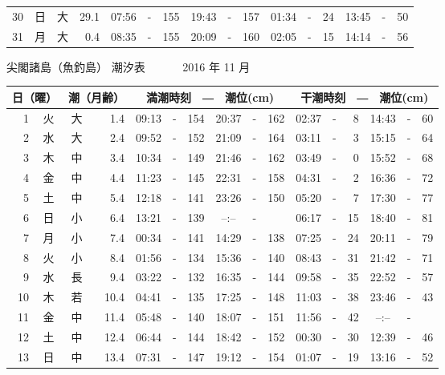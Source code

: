 \documentclass[12pt.a4j]{jsarticle}
\begin{document}
\begin{center}
\begin{table}[ht]
\begin{tabular}{|rc|cr|ccrccr|ccrccr|}
30 & 日 & 大 & 29.1 &  07:56 &-& 155  &  19:43 &-& 157  &   01:34 &-&  24  &   13:45 &-&  50  \\
31 & 月 & 大 &  0.4 &  08:35 &-& 155  &  20:09 &-& 160  &   02:05 &-&  15  &   14:14 &-&  56  \\
   \hline
   \end{tabular}
\end{table}
\newpage
 {\LARGE 尖閣諸島（魚釣島）  潮汐表　　　}
 {\large 2016 年 11 月}\\
 \begin{table}[ht]
    \begin{tabular}{|rc|cr|ccrccr|ccrccr|}
    \hline
    \multicolumn{2}{|c|}{日（曜）} & \multicolumn{2}{c|}{潮（月齢）} & \multicolumn{6}{c|}{満潮時刻　―　潮位(cm)} & \multicolumn{6}{c|}{干潮時刻　―　潮位(cm)} \\
 \hline
 1 & 火 & 大 &  1.4 &  09:13 &-& 154  &  20:37 &-& 162  &   02:37 &-&   8  &   14:43 &-&  60  \\
 2 & 水 & 大 &  2.4 &  09:52 &-& 152  &  21:09 &-& 164  &   03:11 &-&   3  &   15:15 &-&  64  \\
 3 & 木 & 中 &  3.4 &  10:34 &-& 149  &  21:46 &-& 162  &   03:49 &-&   0  &   15:52 &-&  68  \\
 4 & 金 & 中 &  4.4 &  11:23 &-& 145  &  22:31 &-& 158  &   04:31 &-&   2  &   16:36 &-&  72  \\
 5 & 土 & 中 &  5.4 &  12:18 &-& 141  &  23:26 &-& 150  &   05:20 &-&   7  &   17:30 &-&  77  \\
 6 & 日 & 小 &  6.4 &  13:21 &-& 139  &  --:-- &-&     &   06:17 &-&  15  &   18:40 &-&  81  \\
 7 & 月 & 小 &  7.4 &  00:34 &-& 141  &  14:29 &-& 138  &   07:25 &-&  24  &   20:11 &-&  79  \\
 8 & 火 & 小 &  8.4 &  01:56 &-& 134  &  15:36 &-& 140  &   08:43 &-&  31  &   21:42 &-&  71  \\
 9 & 水 & 長 &  9.4 &  03:22 &-& 132  &  16:35 &-& 144  &   09:58 &-&  35  &   22:52 &-&  57  \\
10 & 木 & 若 & 10.4 &  04:41 &-& 135  &  17:25 &-& 148  &   11:03 &-&  38  &   23:46 &-&  43  \\
11 & 金 & 中 & 11.4 &  05:48 &-& 140  &  18:07 &-& 151  &   11:56 &-&  42  &   --:-- &-&     \\
12 & 土 & 中 & 12.4 &  06:44 &-& 144  &  18:42 &-& 152  &   00:30 &-&  30  &   12:39 &-&  46  \\
13 & 日 & 中 & 13.4 &  07:31 &-& 147  &  19:12 &-& 154  &   01:07 &-&  19  &   13:16 &-&  52  \\

\end{tabular}
\end{table}
\end{center}
\end{document}
